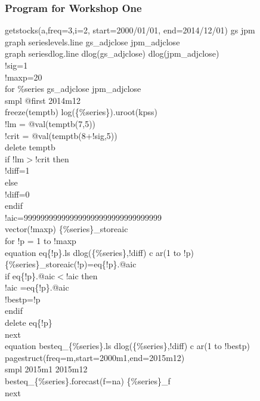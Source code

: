 \documentclass[a4paper,11pt]{article}
\begin{document}
\subsubsection*{Program for Workshop One}
\noindent
getstocks(a,freq=3,i=2, start=2000/01/01, end=2014/12/01) gs jpm\\
graph serieslevels.line gs\_adjclose jpm\_adjclose\\
graph seriesdlog.line dlog(gs\_adjclose) dlog(jpm\_adjclose)\\
!sig=1\\
!maxp=20\\
for \%series gs\_adjclose jpm\_adjclose\\
\indent smpl @first 2014m12\\
\indent	freeze(temptb) log(\{\%series\}).uroot(kpss)\\
\indent	!lm = @val(temptb(7,5))\\
\indent	!crit = @val(temptb(8+!sig,5))\\
\indent	delete temptb\\
\indent	if !lm$>$!crit then\\
\indent \indent		!diff=1\\
\indent	else\\
\indent \indent		!diff=0\\
\indent	endif\\
\indent	!aic=999999999999999999999999999999999\\
\indent	vector(!maxp) \{\%series\}\_storeaic\\
\indent	for !p = 1 to !maxp\\
\indent \indent		equation eq\{!p\}.ls dlog(\{\%series\},!diff) c ar(1 to !p)\\
\indent \indent		\{\%series\}\_storeaic(!p)=eq\{!p\}.@aic\\
\indent \indent		if eq\{!p\}.@aic$<$!aic then\\
\indent \indent \indent			!aic =eq\{!p\}.@aic\\
\indent \indent \indent			!bestp=!p\\
\indent \indent		endif\\
\indent \indent		delete eq\{!p\}\\
\indent	next\\
\indent	equation besteq\_\{\%series\}.ls dlog(\{\%series\},!diff) c ar(1 to !bestp)\\
\indent	pagestruct(freq=m,start=2000m1,end=2015m12)\\
\indent	smpl 2015m1 2015m12\\
\indent	besteq\_\{\%series\}.forecast(f=na) \{\%series\}\_f\\
next
\end{document}
